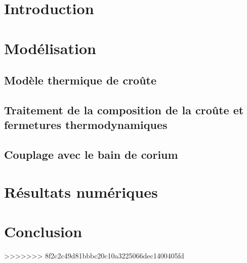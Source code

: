 \documentclass[12pt,a4paper]{article}
\begin{document}
\section{Introduction}
\section{Modélisation}
\subsection{Modèle thermique de croûte} \label{sect:thermique}

\subsection{Traitement de la composition de la croûte et fermetures thermodynamiques} \label{sect:thermochimie}

\subsection{Couplage avec le bain de corium}\label{couplage}

\section{Résultats numériques}

\section{Conclusion}




>>>>>>> 8f2c2c49d81bbbc20c10a3225066dec1400405fd
\end{document}
